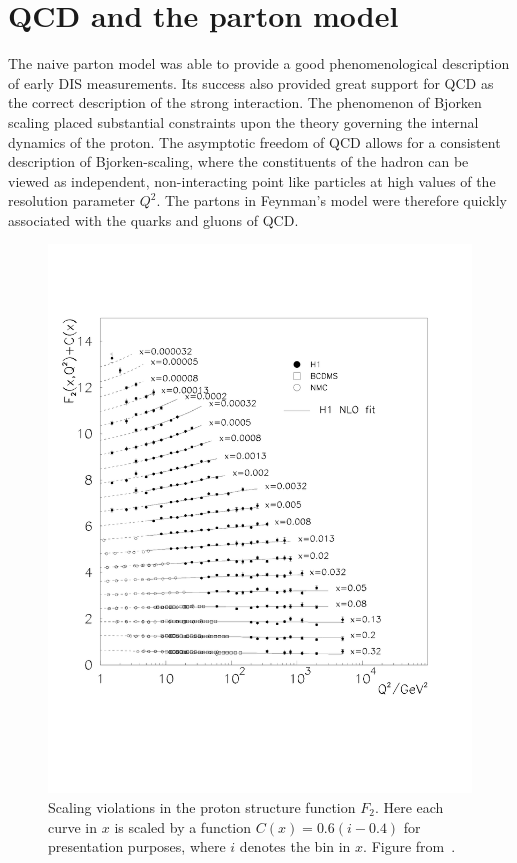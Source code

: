 \section{QCD and the parton model}
The naive parton model was able to provide a good phenomenological description of early DIS measurements. Its success also provided great support for QCD as the correct description of the strong interaction. The phenomenon of Bjorken scaling placed substantial constraints upon the theory governing the internal dynamics of the proton. The asymptotic freedom of QCD allows for a consistent description of Bjorken-scaling, where the constituents of the hadron can be viewed as independent, non-interacting point like particles at high  values of the resolution parameter $Q^2$. The partons in Feynman's model were therefore quickly associated with the quarks and gluons of QCD.
\begin{figure}[t]
\centering
\includegraphics[scale=0.5]{2-PDFs/figs/d96-039f11.pdf}
\caption[Scaling violations in the proton structure function $F_2$]{Scaling violations in the proton structure function $F_2$. Here each curve in $x$ is scaled by a function $C(x)= 0.6(i- 0.4)$ for presentation purposes, where $i$ denotes the bin in $x$. Figure from~\cite{Aid:1996au}.}
\label{fig:F2H1}
\end{figure}

